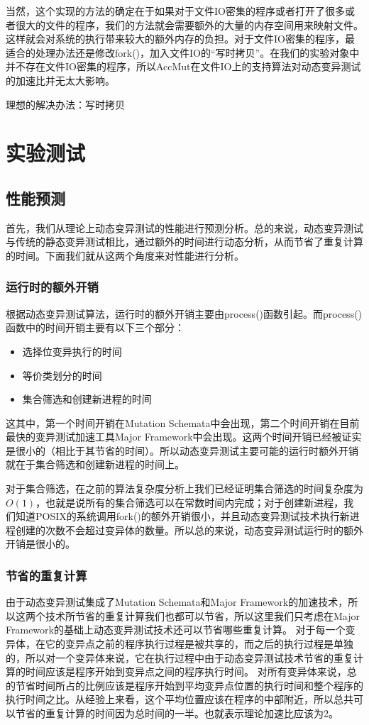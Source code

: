 \documentclass[nofonts]{ctexrep}
\begin{document}
当然，这个实现的方法的确定在于如果对于文件IO密集的程序或者打开了很多或者很大的文件的程序，我们的方法就会需要额外的大量的内存空间用来映射文件。这样就会对系统的执行带来较大的额外内存的负担。对于文件IO密集的程序，最适合的处理办法还是修改fork()，加入文件IO的``写时拷贝''。在我们的实验对象中并不存在文件IO密集的程序，所以AccMut在文件IO上的支持算法对动态变异测试的加速比并无太大影响。


理想的解决办法：写时拷贝

\chapter{实验测试}
\section{性能预测}
首先，我们从理论上动态变异测试的性能进行预测分析。总的来说，动态变异测试与传统的静态变异测试相比，通过额外的时间进行动态分析，从而节省了重复计算的时间。下面我们就从这两个角度来对性能进行分析。
\subsection{ 运行时的额外开销}
根据动态变异测试算法，运行时的额外开销主要由process()函数引起。而process()函数中的时间开销主要有以下三个部分：
\begin{itemize}
\item
选择位变异执行的时间
\item
等价类划分的时间
\item
集合筛选和创建新进程的时间
\end{itemize}
这其中，第一个时间开销在Mutation Schemata中会出现，第二个时间开销在目前最快的变异测试加速工具Major Framework中会出现。这两个时间开销已经被证实是很小的（相比于其节省的时间）。所以动态变异测试主要可能的运行时额外开销就在于集合筛选和创建新进程的时间上。

对于集合筛选，在之前的算法复杂度分析上我们已经证明集合筛选的时间复杂度为$O(1)$，也就是说所有的集合筛选可以在常数时间内完成；对于创建新进程，我们知道POSIX的系统调用fork()的额外开销很小，并且动态变异测试技术执行新进程创建的次数不会超过变异体的数量。所以总的来说，动态变异测试运行时的额外开销是很小的。

\subsection{ 节省的重复计算}
由于动态变异测试集成了Mutation Schemata和Major Framework的加速技术，所以这两个技术所节省的重复计算我们也都可以节省，所以这里我们只考虑在Major Framework的基础上动态变异测试技术还可以节省哪些重复计算。
对于每一个变异体，在它的变异点之前的程序执行过程是被共享的，而之后的执行过程是单独的，所以对一个变异体来说，它在执行过程中由于动态变异测试技术节省的重复计算的时间应该是程序开始到变异点之间的程序执行时间。
对所有变异体来说，总的节省时间所占的比例应该是程序开始到平均变异点位置的执行时间和整个程序的执行时间之比。从经验上来看，这个平均位置应该在程序的中部附近，所以总共可以节省的重复计算的时间因为总时间的一半。也就表示理论加速比应该为2。
\end{document}
